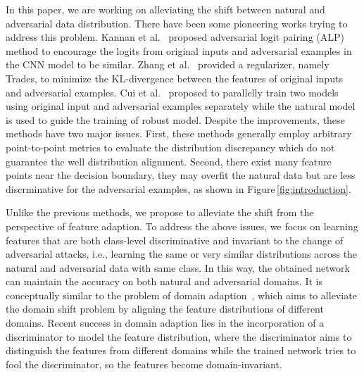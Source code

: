 \documentclass[10pt,twocolumn,letterpaper]{article}
\begin{document}
\begin{table*}[!t]
\begin{tabular}{l|c|ccc|ccc|ccc}
        \end{tabular}
        
    \end{table*}

In this paper, we are working on alleviating the shift between natural and adversarial data distribution. There have been some pioneering works trying to address this problem. Kannan et al.~\cite{58kannan2018adversarial} proposed adversarial logit pairing (ALP) method to encourage the logits from original inputs and adversarial examples in the CNN model to be similar. Zhang et al.~\cite{Zhang2019tradeoff} provided a regularizer, namely Trades, to minimize the KL-divergence between the features of original inputs and adversarial examples. Cui et al.~\cite{cui2020learnable} proposed to parallelly train two models using original input and adversarial examples separately while the natural model is used to guide the training of robust model. Despite the improvements, these methods have two major issues. First, these methods generally employ arbitrary point-to-point metrics to evaluate the distribution discrepancy which do not guarantee the well distribution alignment. Second, there exist many feature points near the decision boundary, they may overfit the natural data but are less discrminative for the adversarial examples, as shown in Figure\,\ref{fig:introduction}.





Unlike the previous methods, we propose to alleviate the shift from the perspective of feature adaption. To address the above issues, we focus on learning features that are both class-level discriminative and invariant to the change of adversarial attacks, i.e., learning the same or very similar distributions across the natural and adversarial data with same class. In this way, the obtained network can maintain the accuracy on both natural and adversarial domains. It is conceptually similar to the problem of domain adaption~\cite{Haoran_2020_ECCV, Ganin2015dann,kang2019contrastive}, which aims to alleviate the domain shift problem by aligning the feature distributions of different domains. Recent success in domain adaption lies in the incorporation of a discriminator to model the feature distribution, where the discriminator aims to distinguish the features from different domains while the trained network tries to fool the discriminator, so the features become domain-invariant.
\end{document}
